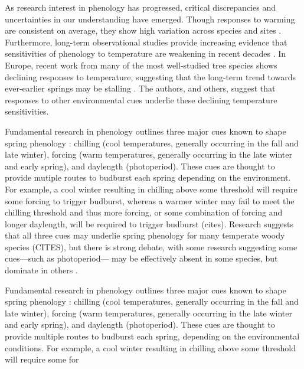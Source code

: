 \documentclass[11pt,letter]{article}
\begin{document}
\par As research interest in phenology has progressed, critical discrepancies and uncertainties in our understanding have emerged. Though responses to warming are consistent on average, they show high variation across species and sites \citep{Wolkovich:2012n}. Furthermore, long-term observational studies provide increasing evidence that sensitivities of phenology to temperature are weakening in recent decades \citep{yu2010}. In Europe, recent work from many of the most well-studied tree species shows declining responses to temperature, suggesting that the long-term trend towards ever-earlier springs may be stalling \citep{fu2015}. The authors, and others, suggest that responses to other environmental cues underlie these declining temperature sensitivities.

\par Fundamental research in phenology outlines three major cues known to shape spring phenology \citep{chuineJTB}: chilling (cool temperatures, generally occurring in the fall and late winter), forcing (warm temperatures, generally occurring in the late winter and early spring), and daylength (photoperiod). These cues are thought to provide mutiple routes to budburst each spring depending on the environment. For example, a cool winter resulting in chilling above some threshold will require some forcing to trigger budburst, whereas a warmer winter may fail to meet the chilling threshold and thus more forcing, or some combination of forcing and longer daylength, will be required to trigger budburst (cites). Research suggests that all three cues may underlie spring phenology for many temperate woody species (CITES), but there is strong debate, with some research suggesting some cues---such as photoperiod--- may be effectively absent in some species, but dominate in others \citep{zohner2016,koerner2010a}. 

\par Fundamental research in phenology outlines three major cues known to shape spring phenology \citep{chuineJTB}: chilling (cool temperatures, generally occurring in the fall and late winter), forcing (warm temperatures, generally occurring in the late winter and early spring), and daylength (photoperiod). These cues are thought to provide multiple routes to budburst each spring, depending on the environmental conditions. For example, a cool winter resulting in chilling above some threshold will require some for
\end{document}

